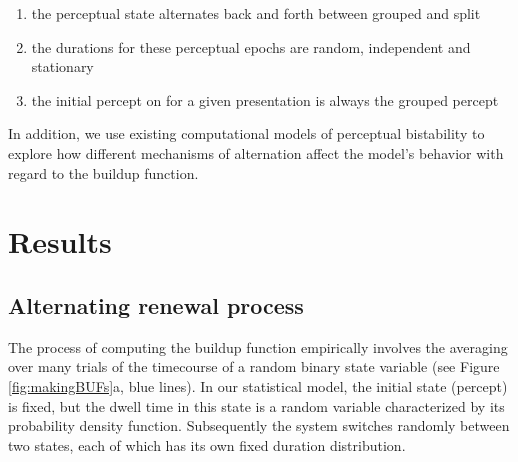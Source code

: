 \documentclass{frontiersSCNS} %
\begin{document}
\begin{enumerate}
\item the perceptual state alternates back and forth between grouped and split
\item the durations for these perceptual epochs are random, independent and stationary
\item the initial percept on for a given presentation is always the grouped percept
\end{enumerate}

In addition, we use existing computational models of perceptual bistability to explore how different mechanisms of alternation affect the model's behavior with regard to the buildup function.

\section{Results}
\subsection*{Alternating renewal process}

The process of computing the buildup function empirically involves the averaging over many trials of the timecourse of a random binary state variable (see Figure \ref{fig:makingBUFs}a, blue lines). In our statistical model, the initial state (percept) is fixed, but the dwell time in this state is a random variable characterized by its probability density function. Subsequently the system switches randomly between two states, each of which has its own fixed duration distribution.
\end{document}
